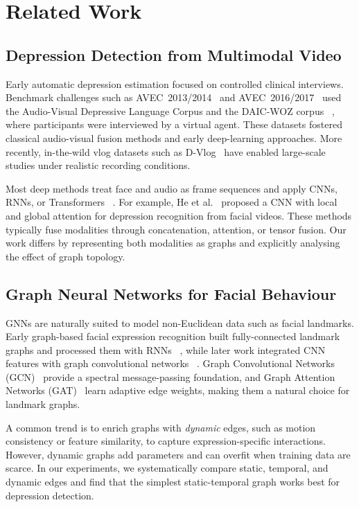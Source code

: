 \documentclass[conference]{IEEEtran}
\begin{document}
\section{Related Work}
\label{sec:related}

\subsection{Depression Detection from Multimodal Video}

Early automatic depression estimation focused on controlled clinical interviews.
Benchmark challenges such as AVEC~2013/2014~
\cite{valstar2014avec} and AVEC~2016/2017~
\cite{ringeval2017avec} used the Audio-Visual Depressive Language Corpus and the DAIC-WOZ corpus~
\cite{gratch2014daic}, where participants were interviewed by a virtual agent.
These datasets fostered classical audio-visual fusion methods and early deep-learning approaches.
More recently, in-the-wild vlog datasets such as D-Vlog~
\cite{yoon2022dvlog} have enabled large-scale studies under realistic recording conditions.

Most deep methods treat face and audio as frame sequences and apply CNNs, RNNs, or Transformers~
\cite{zhou2023tamfn,tao2024depmstat,hua2026asym,he2021automatic}.
For example, He et al.~
\cite{he2021automatic} proposed a CNN with local and global attention for depression recognition from facial videos.
These methods typically fuse modalities through concatenation, attention, or tensor fusion.
Our work differs by representing both modalities as graphs and explicitly analysing the effect of graph topology.

\subsection{Graph Neural Networks for Facial Behaviour}

GNNs are naturally suited to model non-Euclidean data such as facial landmarks.
Early graph-based facial expression recognition built fully-connected landmark graphs and processed them with RNNs~
\cite{zhong2019graphbrnn}, while later work integrated CNN features with graph convolutional networks~
\cite{liao2022fergcn}.
Graph Convolutional Networks (GCN)~
\cite{kipf2017gcn} provide a spectral message-passing foundation, and Graph Attention Networks (GAT)~
\cite{velickovic2018graph} learn adaptive edge weights, making them a natural choice for landmark graphs.

A common trend is to enrich graphs with \emph{dynamic} edges, such as motion consistency or feature similarity, to capture expression-specific interactions.
However, dynamic graphs add parameters and can overfit when training data are scarce.
In our experiments, we systematically compare static, temporal, and dynamic edges and find that the simplest static-temporal graph works best for depression detection.
\end{document}
